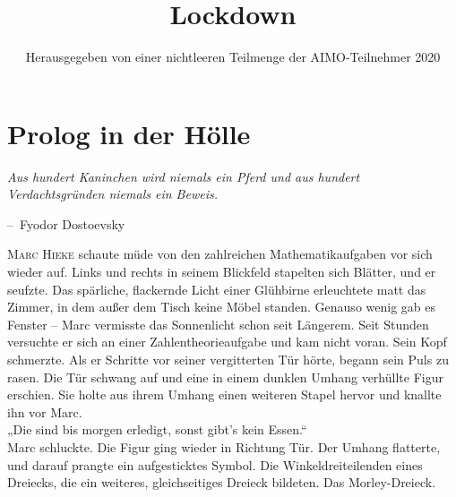 \documentclass[oneside]{memoir}
\title{Lockdown}
\author{Herausgegeben von einer nichtleeren Teilmenge der AIMO-Teilnehmer 2020}
\makeatletter
\newenvironment{chapquote}[2][2em]
  {\setlength{\@tempdima}{#1}%
   \def\chapquote@author{#2}%
   \parshape 1 \@tempdima \dimexpr\textwidth-2\@tempdima\relax%
   \itshape}
  {\par\normalfont\hfill--\ \chapquote@author\hspace*{\@tempdima}\par\bigskip}
\makeatother
\begin{document}
\begin{titlingpage}
\maketitle
\end{titlingpage}
\newpage
\thispagestyle{empty}
\begin{center}
\end{center}
\setcounter{page}{2}
\chapter{Prolog in der Hölle}

\begin{chapquote}{Fyodor Dostoevsky}
\glqq Aus hundert Kaninchen wird niemals ein Pferd und aus hundert Verdachtsgründen niemals ein Beweis.\grqq
\end{chapquote}

\lettrine{M}{arc Hieke} schaute müde von den zahlreichen Mathematikaufgaben vor sich wieder auf. Links und rechts in seinem Blickfeld stapelten sich Blätter, und er seufzte. Das spärliche, flackernde Licht einer Glühbirne erleuchtete matt das Zimmer, in dem außer dem Tisch keine Möbel standen. Genauso wenig gab es Fenster -- Marc vermisste das Sonnenlicht schon seit Längerem. Seit Stunden versuchte er sich an einer Zahlentheorieaufgabe und kam nicht voran. Sein Kopf schmerzte. Als er Schritte vor seiner vergitterten Tür hörte, begann sein Puls zu rasen. Die Tür schwang auf und eine in einem dunklen Umhang verhüllte Figur erschien. Sie holte aus ihrem Umhang einen weiteren Stapel hervor und knallte ihn vor Marc. \\
„Die sind bis morgen erledigt, sonst gibt's kein Essen.“ \\
Marc schluckte. Die Figur ging wieder in Richtung Tür. Der Umhang flatterte, und darauf prangte ein aufgesticktes Symbol. Die Winkeldreiteilenden eines Dreiecks, die ein weiteres, gleichseitiges Dreieck bildeten. Das Morley-Dreieck.
\end{document}
